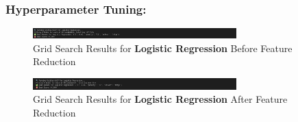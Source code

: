 \documentclass[a4paper,12pt]{article}
\begin{document}
\subsubsection{Hyperparameter Tuning:}
\begin{figure}[H]
    \centering
    \includegraphics[width=0.7\textwidth]{./images/gslr1.png}
    \caption{Grid Search Results for \textbf{Logistic Regression} Before Feature Reduction}
    \label{fig:fig_7}
\end{figure}
\begin{figure}[H]
    \centering
    \includegraphics[width=0.7\textwidth]{./images/gslr2.png}
    \caption{Grid Search Results for \textbf{Logistic Regression} After Feature Reduction}
    \label{fig:fig_8}
\end{figure}
\end{document}
